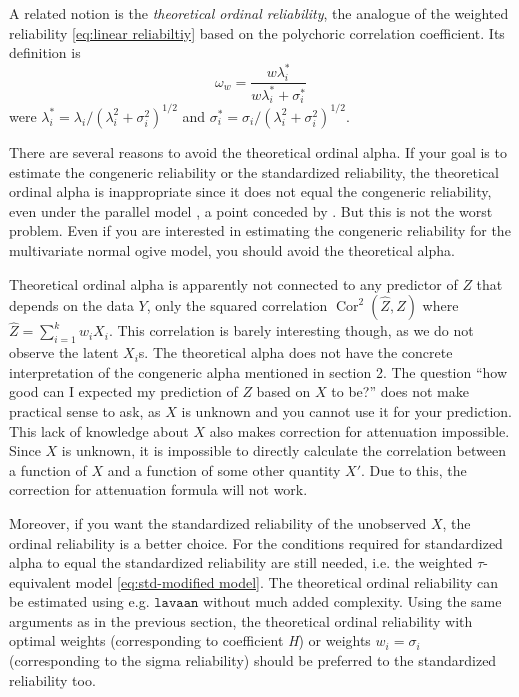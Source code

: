 \documentclass[twoside]{article}
\DeclareMathOperator{\Cor}{Cor}
\renewcommand{\sqrt}[1]{{(#1)^{1/2}}}
\begin{document}
A related notion is the \textit{theoretical ordinal reliability}, the
analogue of the weighted reliability \eqref{eq:linear reliabiltiy} based on the polychoric
correlation coefficient. Its definition is 
\begin{equation}
\omega_{w}=\frac{w\lambda_{i}^{*}}{w\lambda_{i}^{*}+\sigma_{i}^{*}}\label{eq:ordinal omega}
\end{equation}
were $\lambda_{i}^{*}=\lambda_{i}/\sqrt{\lambda_{i}^{2}+\sigma_{i}^{2}}$
and $\sigma_{i}^{*}=\sigma_{i}/\sqrt{\lambda_{i}^{2}+\sigma_{i}^{2}}$.

There are several reasons to avoid the theoretical ordinal alpha. If your
goal is to estimate the congeneric reliability or the standardized
reliability, the theoretical ordinal alpha is inappropriate since
it does not equal the congeneric reliability, even under the parallel
model \citep[p. 1062, "Misconception 2"]{Chalmers2018-fj}, a point
conceded by \citet{Zumbo2019-lm}. But this is not the worst problem.
Even if you are interested in estimating the congeneric reliability
for the multivariate normal ogive model, you should avoid the theoretical
alpha.

Theoretical ordinal alpha is apparently not connected to any predictor
of $Z$ that depends on the data $Y$, only the squared correlation $\Cor^{2}(\hat{Z},Z)$ where $\hat{Z}=\sum_{i=1}^k w_iX_i$. This correlation is barely interesting though, as we do not observe
the latent $X_{i}$s. The theoretical alpha does not have the concrete
interpretation of the congeneric alpha mentioned in section 2. The question
``how good can I expected my prediction of $Z$ based on $X$ to
be?'' does not make practical sense to ask, as $X$ is unknown and you cannot use it for your prediction. This
lack of knowledge about $X$ also makes correction for attenuation
impossible. Since $X$ is unknown, it is impossible to directly calculate
the correlation between a function of $X$ and a function of some
other quantity $X'$. Due to this, the correction for attenuation formula
will not work. 

Moreover, if you want the standardized reliability of the unobserved
$X$, the ordinal reliability is a better choice. For the conditions
required for standardized alpha to equal the standardized reliability
are still needed, i.e. the weighted $\tau$-equivalent model \eqref{eq:std-modified model}. The
theoretical ordinal reliability can be estimated using e.g. $\mathtt{lavaan}$
without much added complexity. Using the same arguments as in the
previous section, the theoretical ordinal reliability with optimal
weights (corresponding to coefficient \textit{H}) or weights $w_{i}=\sigma_{i}$
(corresponding to the sigma reliability) should be preferred to the
standardized reliability too.
\end{document}

